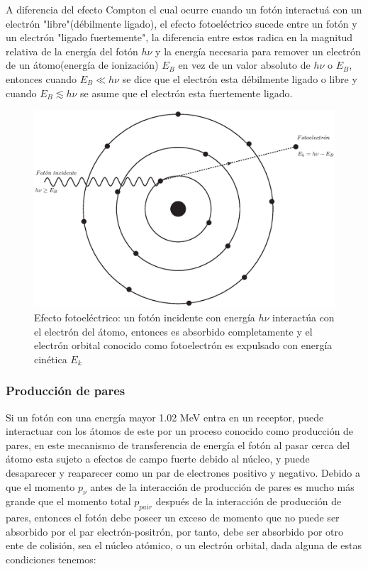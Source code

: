 A diferencia del efecto Compton el cual ocurre cuando un fotón interactuá con un electrón "libre"(débilmente ligado), el efecto fotoeléctrico sucede entre un fotón y un electrón "ligado fuertemente", la diferencia entre estos radica en la magnitud relativa de la energía del fotón $h\nu$ y la energía necesaria para remover un electrón de un átomo(energía de ionización) $E_B$ en vez de un valor absoluto de $h\nu$ o $E_B$, entonces cuando $E_B\ll h\nu$ se dice que el electrón esta débilmente ligado o libre y cuando  $E_B \lesssim h\nu$ se asume que el electrón esta fuertemente ligado\cite{Podgorsak}.


\begin{figure}[htbp]
    \centering
    \includegraphics[width=.71\linewidth]{./Figures/fotoelec.eps}
    \caption[Efecto fotoeléctrico]{Efecto fotoeléctrico: un fotón incidente con energía $h\nu$ interactúa con el electrón del átomo, entonces es absorbido completamente y el electrón orbital conocido como fotoelectrón es expulsado con energía cinética $E_k$}
    \label{fig:FT}
\end{figure}

\subsubsection{Producción de pares}
Si un fotón con una energía mayor  1.02 MeV entra en un receptor, puede interactuar con los átomos de este por un proceso conocido como producción de pares, en este mecanismo de transferencia de energía el fotón al pasar cerca del átomo esta sujeto a efectos de campo fuerte debido al núcleo, y puede desaparecer y reaparecer como un par de electrones positivo y negativo.\cite{Edward}
Debido a que el momento $p_\nu$ antes de la interacción de producción de pares es mucho más grande que el momento total  $p_{pair}$ después de la interacción de producción de pares,  entonces el fotón debe poseer un exceso de momento que no puede ser absorbido por el par electrón-positrón, por tanto, debe ser absorbido por otro ente de colisión, sea el núcleo atómico, o un electrón orbital\cite{Podgorsak}, dada alguna de estas condiciones tenemos:
